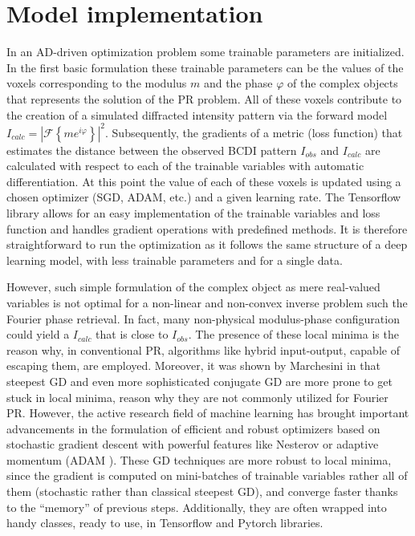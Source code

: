 \section{Model implementation}
In an AD-driven optimization problem some trainable parameters are initialized. In the first basic formulation these 
trainable parameters can be the values of the voxels corresponding to the modulus $m$ and the phase $\varphi$ of the complex objects 
that represents the solution of the PR problem. All of these voxels contribute to the creation of a simulated 
diffracted intensity pattern via the forward model $I_{calc} = |\mathcal{F}\left\{ me^{i\varphi} \right\}|^2$. Subsequently, 
the gradients of a metric (loss function) that estimates the distance between the observed BCDI pattern $I_{obs}$ and $I_{calc}$ are calculated 
with respect to each of the trainable variables with automatic differentiation. At this point the value of each of these voxels is 
updated using a chosen optimizer (SGD, ADAM, etc.) and a given learning rate. The Tensorflow library allows for an easy 
implementation of the trainable variables and loss function and handles gradient operations with predefined methods. It is therefore 
straightforward to run the optimization as it follows the same structure of a deep learning model, with less trainable parameters and 
for a single data. 

However, such simple formulation of the complex object as mere real-valued variables is not optimal for a non-linear and non-convex 
inverse problem such the Fourier phase retrieval. In fact, many non-physical modulus-phase configuration could yield a 
$I_{calc}$ that is close to  $I_{obs}$. The presence of these local minima is the reason why, in conventional PR, algorithms 
like hybrid input-output, capable of escaping them, are employed. 
Moreover, it was shown by Marchesini in \cite{marchesini_unified_2007}
that steepest GD and even more sophisticated conjugate GD are more prone to get stuck in local 
minima, reason why they are not commonly utilized for Fourier PR. However, the active research field of machine learning has 
brought important advancements in the formulation of efficient and robust optimizers based on stochastic gradient descent with 
powerful features like Nesterov or adaptive momentum (ADAM \cite{ADAM}). These GD techniques are more robust to local minima, 
since the gradient is computed on mini-batches of trainable variables rather all of them (stochastic rather than classical steepest GD), 
and converge faster thanks to the ``memory'' of previous steps. Additionally, they are often wrapped into handy classes, ready to use, 
in Tensorflow and Pytorch libraries.  

